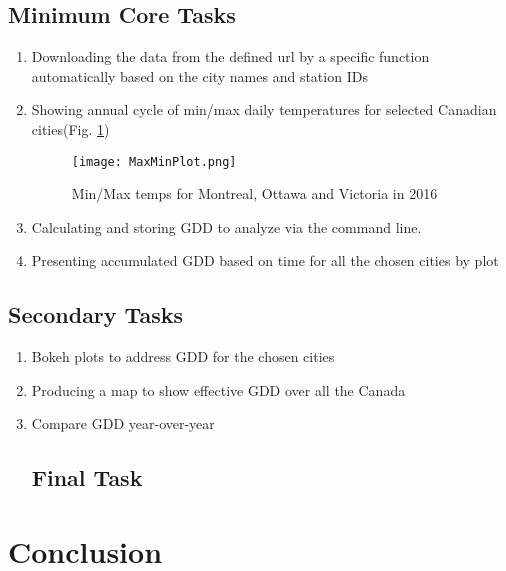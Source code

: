 \documentclass{article}
\begin{document}
\subsection{ \bf Minimum Core Tasks}

\begin{enumerate}
\item  Downloading the data from the defined url by a specific function automatically based on the city names and station IDs
\item  Showing annual cycle of min/max daily temperatures for selected Canadian cities(Fig. \ref{min-max})
\begin{center}
\begin{figure}[H]
\centering
\texttt{[image: MaxMinPlot.png]}

\caption{Min/Max temps for Montreal, Ottawa and Victoria in 2016}
\label{min-max}
\end{figure}
\end{center}

\item Calculating and storing GDD to analyze via the command line.
\item  Presenting accumulated GDD based on time for all the chosen cities by plot


\end{enumerate}


\subsection{ \bf Secondary Tasks }
\begin{enumerate}
\item Bokeh plots to address GDD for the  chosen cities

\item Producing  a map to show effective GDD over  all the Canada
\item Compare GDD year-over-year

\subsection {\bf Final Task} 


\end{enumerate}

\section{Conclusion}

 
\end{document}
